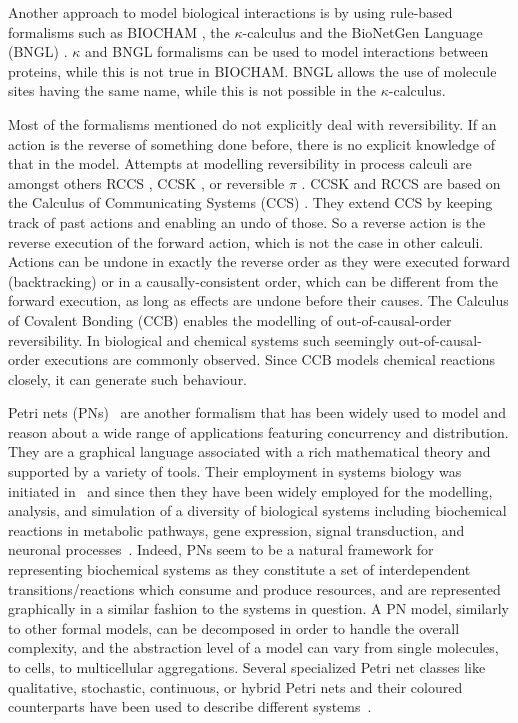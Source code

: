 \documentclass[runningheads]{llncs}
\begin{document}
Another approach to model biological interactions is by using rule-based formalisms such as BIOCHAM \cite{biocham}, the $\kappa$-calculus  \cite{danoscausality} and the BioNetGen Language (BNGL) \cite{pmid19399430}. $\kappa$ and BNGL formalisms can be used to model interactions between proteins, while this is not true in BIOCHAM. BNGL allows the use of molecule sites having the same name, while this is not possible in the $\kappa$-calculus.

Most of the formalisms mentioned do not explicitly deal with reversibility. If an action is the reverse of something done before, there is no explicit knowledge of that in the model. Attempts at modelling reversibility in process calculi are  amongst others RCCS \cite{danos2004ccsr}, CCSK \cite{Irek2007}, or reversible $\pi$ \cite{Lanese_controllingreversibility,Lanese_controlled}. CCSK and RCCS are based on the Calculus of Communicating Systems (CCS) \cite{MilnerBook}. They extend CCS by keeping track of past actions and enabling an undo of those. So a reverse action is the reverse execution of the forward action, which is not the case in other calculi. Actions can be undone in exactly the reverse order as they were executed forward (backtracking) or in a causally-consistent order, which can be different from the forward execution, as long as effects are undone before their causes. The Calculus of Covalent Bonding (CCB) \cite{KUHN201818} enables the modelling of out-of-causal-order reversibility. In biological and chemical systems such seemingly out-of-causal-order executions are commonly observed. Since CCB models chemical reactions closely, it can generate such behaviour.

Petri nets (PNs)~\cite{PNs} are another formalism that has been widely used to model and reason
about a wide range of applications featuring concurrency and distribution. They are a graphical 
language  associated with 
a rich mathematical theory and supported by a variety of tools. Their employment in systems 
biology was initiated in~\cite{DBLP:conf/ismb/ReddyML93,DBLP:journals/jsamas/HofestadtH94}
and since then they have been widely employed for
the modelling, analysis, and simulation of a diversity of biological systems including 
biochemical reactions in metabolic pathways, gene expression, signal transduction, and neuronal processes~\cite{PNbiology,DBLP:journals/bib/Chaouiya07,DBLP:journals/nc/BaldanCMS10}. Indeed, PNs seem to be a natural framework for representing biochemical systems as they constitute a set of interdependent
transitions/reactions which consume 
and produce resources, and are represented graphically in a similar fashion to the systems
in question. A PN model, similarly to other formal models, 
can be decomposed in order to handle the overall complexity, and the abstraction level of a model
can vary from single molecules, to cells, to multicellular aggregations.
Several specialized Petri net classes like qualitative, stochastic, continuous, or
hybrid Petri nets and their coloured counterparts have been used to describe different
systems~\cite{DBLP:journals/jamia/PelegRA05,DBLP:journals/isb/HofestadtT98,DBLP:journals/fuin/Popova-ZeugmannHK05,DBLP:journals/nc/MatsunoNM11,DBLP:journals/isb/VossHK03}.
\end{document}
